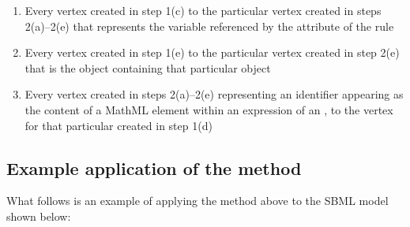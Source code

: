 \begin{enumerate}
\begin{enumerate}
  \item Every vertex created in step 1(c) to the particular vertex
    created in steps 2(a)--2(e) that represents the variable
    referenced by the  attribute of the rule
    
  \item Every vertex created in step 1(e) to the particular vertex
    created in step 2(e) that is the \Reaction object containing
    that particular \KineticLaw object
    
  \item Every vertex created in steps 2(a)--2(e) representing an
    identifier appearing as the content of a MathML 
    element within an expression of an \AlgebraicRule, to the
    vertex for that particular \AlgebraicRule created in step 1(d)
    
  \end{enumerate}

\end{enumerate}


\subsection*{Example application of the method}

What follows is an example of applying the method above to the
SBML model shown below:

\vspace*{2ex}

